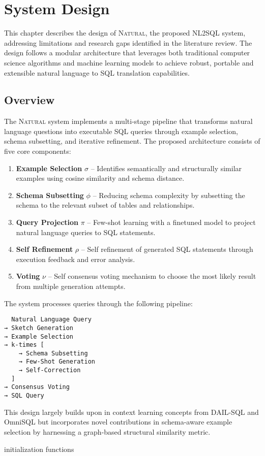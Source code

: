 \section{System Design}

This chapter describes the design of \textsc{Natural}, the proposed NL2SQL system, 
addressing limitations and research gaps identified in the literature review.
The design follows a modular architecture that leverages both traditional computer
science algorithms and machine learning models to achieve robust, portable and
extensible natural language to SQL translation capabilities.

\subsection{Overview}

The \textsc{Natural} system implements a multi-stage pipeline that transforms natural
language questions into executable SQL queries through example selection,
schema subsetting, and iterative refinement. The proposed architecture consists
of five core components:

\begin{enumerate}
    \item \textbf{Example Selection} $\sigma$ – Identifies semantically and structurally similar examples using cosine similarity and schema distance.
    \item \textbf{Schema Subsetting} $\phi$ – Reducing schema complexity by subsetting the schema to the relevant subset of tables and relationships.
    \item \textbf{Query Projection} $\pi$ – Few-shot learning with a finetuned model to project natural language queries to SQL statements.
    \item \textbf{Self Refinement} $\rho$ – Self refinement of generated SQL statements through execution feedback and error analysis.
    \item \textbf{Voting} $\nu$ – Self consensus voting mechanism to choose the most likely result from multiple generation attempts.
\end{enumerate}

The system processes queries through the following pipeline:


\begin{verbatim}
  Natural Language Query 
→ Sketch Generation
→ Example Selection
→ k-times [
    → Schema Subsetting
    → Few-Shot Generation
    → Self-Correction
  ]
→ Consensus Voting
→ SQL Query
\end{verbatim}

This design largely builds upon in context learning concepts from DAIL-SQL \citep{DAIL-SQL}
and OmniSQL \citep{OmniSQL} but incorporates novel contributions in schema-aware example
selection by harnessing a graph-based structural similarity metric.

{initialization}
{functions}
